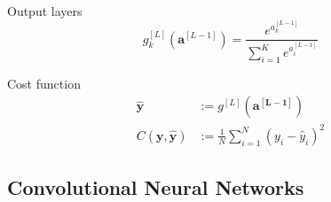 \begin{frame}
  \begin{block}{Output layers}
    \[
      g_k^{[L]}(\bm{a}^{[L - 1]}) = \frac{e^{a_k^{[L - 1]}}}{\sum_{i = 1}^K e^{a_i^{[L - 1]}}}
    \]
  \end{block}
  
  \begin{block}{Cost function}
    \begin{align*}
      \hat{\bm{y}} &:= g^{[L]}(\bm{a^{[L - 1]}}) \\
      C(\bm{y}, \hat{\bm{y}}) &:= \frac{1}{N} \sum_{i = 1}^N (y_i - \hat{y}_i)^2
    \end{align*}
  \end{block}
\end{frame}

\subsection{Convolutional Neural Networks}

\begin{frame}{\insertsubsec}
  
\end{frame}
